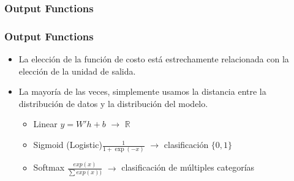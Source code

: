 \documentclass[
  shownotes,
  xcolor={svgnames},
  hyperref={colorlinks,citecolor=DarkBlue,linkcolor=DarkRed,urlcolor=DarkBlue}
  , aspectratio=169]{beamer}
\begin{document}
\subsubsection{Output Functions}
\begin{frame}
\frametitle{Output Functions}

\begin{itemize}
\item La elección de la función de costo está estrechamente relacionada con la elección de la unidad de salida.
\medskip
\item La mayoría de las veces, simplemente usamos la distancia entre la distribución de datos y la distribución del modelo.
\medskip
\begin{itemize}

    \item Linear $y=W'h +b$ $\rightarrow$  $\mathbb{R}$
    \medskip
    \item Sigmoid (Logistic)$\frac{1}{1 + \exp(-x)}$ $\rightarrow$ clasificación $\{0,1\}$
    \medskip
    \item Softmax $\frac{exp(x)}{\sum exp(x))}$ $\rightarrow$ clasificación de múltiples categorías
\end{itemize}
\end{itemize}

\end{frame}


\end{document}
